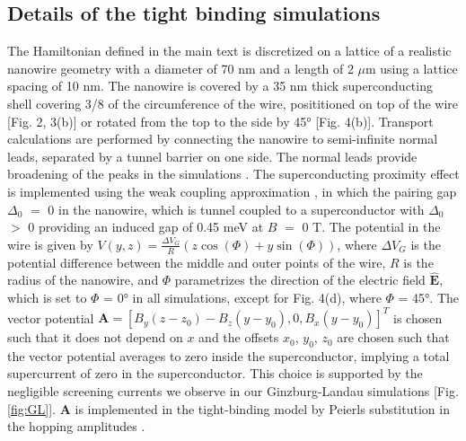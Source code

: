 \subsection{Details of the tight binding simulations}
The Hamiltonian defined in the main text is discretized on a lattice of a realistic nanowire geometry with a diameter of 70 nm and a length of 2 $\mu$m using a lattice spacing of 10 nm. The nanowire is covered by a 35 nm thick superconducting shell covering 3/8 of the circumference of the wire, posititioned on top of the wire [Fig. 2, 3(b)] or rotated from the top to the side by \ang{45} [Fig. 4(b)]. Transport calculations are performed by connecting the nanowire to semi-infinite normal leads, separated by a tunnel barrier on one side. The normal leads provide broadening of the peaks in the simulations \cite{Liu2017,Danon2017}. The superconducting proximity effect is implemented using the weak coupling approximation \cite{Nijholt2016}, in which the pairing gap $\Delta_0$ $=$ 0 in the nanowire, which is tunnel coupled to a superconductor with $\Delta_0$ $>$ 0 providing an induced gap of 0.45 meV at $B$ $=$ 0 T. The potential in the wire is given by $V(y,z)= \frac{\Delta V_G}{R} (z\cos(\Phi)+y\sin(\Phi))$, where $\Delta V_G$ is the potential difference between the middle and outer points of the wire, $R$ is the radius of the nanowire, and $\Phi$ parametrizes the direction of the electric field $\mathbf{\hat{E}}$, which is set to $\Phi$ = \ang{0} in all simulations, except for Fig. 4(d), where $\Phi$ = \ang{45}. The vector potential $\mathbf{A} = \left[B_y(z-z_0)-B_z(y-y_0),0,B_x(y-y_0)\right]^T$ is chosen such that it does not depend on $x$ and the offsets $x_0$, $y_0$, $z_0$ are chosen such that the vector potential averages to zero inside the superconductor, implying a total supercurrent of zero in the superconductor. This choice is supported by the negligible screening currents we observe in our Ginzburg-Landau simulations [Fig. \ref{fig:GL}]. $\mathbf{A}$ is implemented in the tight-binding model by Peierls substitution in the hopping amplitudes \cite{Hofstader1976}.

